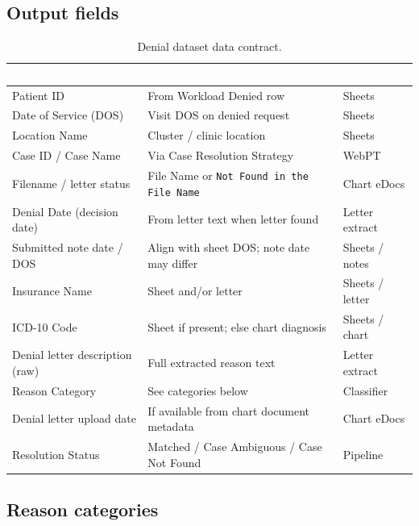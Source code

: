 \documentclass[11pt,a4paper]{article}
\begin{document}
\subsection{Output fields}

\begin{table}[h!]
\centering
\renewcommand{\arraystretch}{1.15}
\begin{tabularx}{\linewidth}{L{4.0cm} X L{2.4cm}}
\toprule
{}
\textcolor{white}{\bfseries Field} &
\textcolor{white}{\bfseries Notes} &
\textcolor{white}{\bfseries Source} \\
\midrule
Patient ID & From Workload Denied row & Sheets \\
Date of Service (DOS) & Visit DOS on denied request & Sheets \\
Location Name & Cluster / clinic location & Sheets \\
Case ID / Case Name & Via Case Resolution Strategy & WebPT \\
Filename / letter status & File Name or \texttt{Not Found in the File Name} & Chart eDocs \\
Denial Date (decision date) & From letter text when letter found & Letter extract \\
Submitted note date / DOS & Align with sheet DOS; note date may differ & Sheets / notes \\
Insurance Name & Sheet and/or letter & Sheets / letter \\
ICD-10 Code & Sheet if present; else chart diagnosis & Sheets / chart \\
Denial letter description (raw) & Full extracted reason text & Letter extract \\
Reason Category & See categories below & Classifier \\
Denial letter upload date & If available from chart document metadata & Chart eDocs \\
Resolution Status & Matched / Case Ambiguous / Case Not Found & Pipeline \\
\bottomrule
\end{tabularx}
\caption{Denial dataset data contract.}
\end{table}

\subsection{Reason categories}
\end{document}
